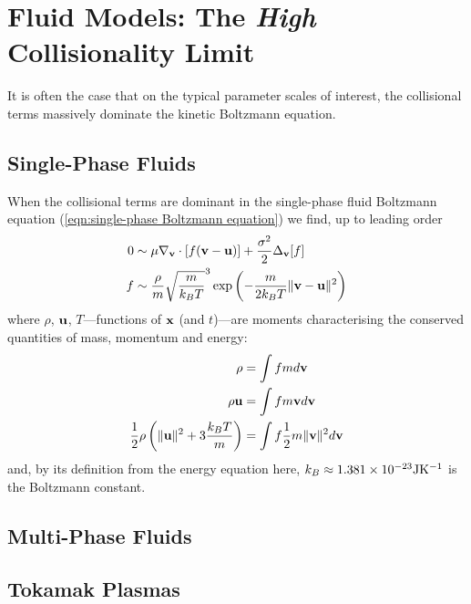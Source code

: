 \section{Fluid Models: The \emph{High} Collisionality Limit}
    It is often the case that on the typical parameter scales of interest, the collisional terms massively dominate the kinetic Boltzmann equation. 
    
    \subsection{Single-Phase Fluids}
        When the collisional terms are dominant in the single-phase fluid Boltzmann equation (\ref{eqn:single-phase Boltzmann equation}) we find, up to leading order
        \begin{align}
            0  &\sim  \mu\nabla_{\mathbf{v}}\cdot[f(\mathbf{v} - \mathbf{u})] + \frac{\sigma^{2}}{2}\Delta_{\mathbf{v}}[f]  \\
            f  &\sim  \frac{\rho}{m}\sqrt{\frac{m}{k_{B}T}}^{3}\exp\left(- \frac{m}{2k_{B}T}\|\mathbf{v} - \mathbf{u}\|^{2}\right)
        \end{align}
        where $\rho$, $\mathbf{u}$, $T$—functions of $\mathbf{x}$ (and $t$)—are moments characterising the conserved quantities of mass, momentum and energy:
        \begin{align}
            \rho  &=  \int fmd\mathbf{v}  \\
            \rho\mathbf{u}  &=  \int fm\mathbf{v} d\mathbf{v}  \\
            \frac{1}{2}\rho\left(\|\mathbf{u}\|^{2} + 3\frac{k_{B}T}{m}\right)  &=  \int f\frac{1}{2}m\|\mathbf{v}\|^{2}d\mathbf{v}
        \end{align}
        and, by its definition from the energy equation here,  $k_{B}  \approx  1.381\times10^{- 23}\mathrm{J}\mathrm{K}^{- 1}$ is the Boltzmann constant.
    
    \subsection{Multi-Phase Fluids}
    \subsection{Tokamak Plasmas}